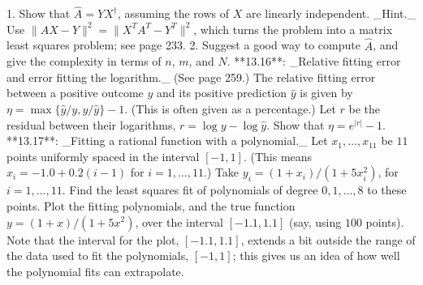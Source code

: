 1. Show that \(\hat{A}=YX^{\dagger}\), assuming the rows of \(X\) are linearly independent. _Hint._ Use \(\|AX-Y\|^{2}=\|X^{T}A^{T}-Y^{T}\|^{2}\), which turns the problem into a matrix least squares problem; see page 233.
2. Suggest a good way to compute \(\hat{A}\), and give the complexity in terms of \(n\), \(m\), and \(N\).
**13.16**: _Relative fitting error and error fitting the logarithm._ (See page 259.) The relative fitting error between a positive outcome \(y\) and its positive prediction \(\hat{y}\) is given by \(\eta=\max\{\hat{y}/y,y/\hat{y}\}-1\). (This is often given as a percentage.) Let \(r\) be the residual between their logarithms, \(r=\log y-\log\hat{y}\). Show that \(\eta=e^{|r|}-1\).
**13.17**: _Fitting a rational function with a polynomial._ Let \(x_{1},\ldots,x_{11}\) be \(11\) points uniformly spaced in the interval \([-1,1]\). (This means \(x_{i}=-1.0+0.2(i-1)\) for \(i=1,\ldots,11\).) Take \(y_{i}=(1+x_{i})/(1+5x_{i}^{2})\), for \(i=1,\ldots,11\). Find the least squares fit of polynomials of degree \(0,1,\ldots,8\) to these points. Plot the fitting polynomials, and the true function \(y=(1+x)/(1+5x^{2})\), over the interval \([-1.1,1.1]\) (say, using \(100\) points). Note that the interval for the plot, \([-1.1,1.1]\), extends a bit outside the range of the data used to fit the polynomials, \([-1,1]\); this gives us an idea of how well the polynomial fits can extrapolate.

